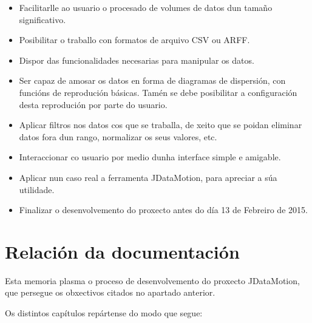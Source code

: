 \begin{itemize}
\item Facilitarlle ao usuario o procesado de volumes de datos dun tamaño significativo. 
\item Posibilitar o traballo con formatos de arquivo CSV ou ARFF. 
\item Dispor das funcionalidades necesarias para manipular os datos. 
\item Ser capaz de amosar os datos en forma de diagramas de dispersión, con funcións de reprodución básicas. Tamén se debe posibilitar a configuración desta reprodución por parte do usuario. 
\item Aplicar filtros nos datos cos que se traballa, de xeito que se poidan eliminar datos fora dun rango, normalizar os seus valores, etc.
\item Interaccionar co usuario por medio dunha interface simple e amigable.
\item Aplicar nun caso real a ferramenta JDataMotion, para apreciar a súa utilidade.
\item Finalizar o desenvolvemento do proxecto antes do día 13 de Febreiro de 2015.
\end{itemize} 

\section{Relación da documentación}

Esta memoria plasma o proceso de desenvolvemento do proxecto JDataMotion, que persegue os obxectivos citados no apartado anterior.

Os distintos capítulos repártense do modo que segue:

